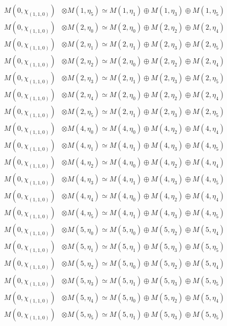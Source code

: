 \begin{align*}
M(0,\chi_{(1,1,0)}) &\otimes M(1,\eta_{5}) \simeq M(1,\eta_{1}) \oplus M(1,\eta_{3}) \oplus M(1,\eta_{5}) \\
M(0,\chi_{(1,1,0)}) &\otimes M(2,\eta_{0}) \simeq M(2,\eta_{0}) \oplus M(2,\eta_{2}) \oplus M(2,\eta_{4}) \\
M(0,\chi_{(1,1,0)}) &\otimes M(2,\eta_{1}) \simeq M(2,\eta_{1}) \oplus M(2,\eta_{3}) \oplus M(2,\eta_{5}) \\
M(0,\chi_{(1,1,0)}) &\otimes M(2,\eta_{2}) \simeq M(2,\eta_{0}) \oplus M(2,\eta_{2}) \oplus M(2,\eta_{4}) \\
M(0,\chi_{(1,1,0)}) &\otimes M(2,\eta_{3}) \simeq M(2,\eta_{1}) \oplus M(2,\eta_{3}) \oplus M(2,\eta_{5}) \\
M(0,\chi_{(1,1,0)}) &\otimes M(2,\eta_{4}) \simeq M(2,\eta_{0}) \oplus M(2,\eta_{2}) \oplus M(2,\eta_{4}) \\
M(0,\chi_{(1,1,0)}) &\otimes M(2,\eta_{5}) \simeq M(2,\eta_{1}) \oplus M(2,\eta_{3}) \oplus M(2,\eta_{5}) \\
M(0,\chi_{(1,1,0)}) &\otimes M(4,\eta_{0}) \simeq M(4,\eta_{0}) \oplus M(4,\eta_{2}) \oplus M(4,\eta_{4}) \\
M(0,\chi_{(1,1,0)}) &\otimes M(4,\eta_{1}) \simeq M(4,\eta_{1}) \oplus M(4,\eta_{3}) \oplus M(4,\eta_{5}) \\
M(0,\chi_{(1,1,0)}) &\otimes M(4,\eta_{2}) \simeq M(4,\eta_{0}) \oplus M(4,\eta_{2}) \oplus M(4,\eta_{4}) \\
M(0,\chi_{(1,1,0)}) &\otimes M(4,\eta_{3}) \simeq M(4,\eta_{1}) \oplus M(4,\eta_{3}) \oplus M(4,\eta_{5}) \\
M(0,\chi_{(1,1,0)}) &\otimes M(4,\eta_{4}) \simeq M(4,\eta_{0}) \oplus M(4,\eta_{2}) \oplus M(4,\eta_{4}) \\
M(0,\chi_{(1,1,0)}) &\otimes M(4,\eta_{5}) \simeq M(4,\eta_{1}) \oplus M(4,\eta_{3}) \oplus M(4,\eta_{5}) \\
M(0,\chi_{(1,1,0)}) &\otimes M(5,\eta_{0}) \simeq M(5,\eta_{0}) \oplus M(5,\eta_{2}) \oplus M(5,\eta_{4}) \\
M(0,\chi_{(1,1,0)}) &\otimes M(5,\eta_{1}) \simeq M(5,\eta_{1}) \oplus M(5,\eta_{3}) \oplus M(5,\eta_{5}) \\
M(0,\chi_{(1,1,0)}) &\otimes M(5,\eta_{2}) \simeq M(5,\eta_{0}) \oplus M(5,\eta_{2}) \oplus M(5,\eta_{4}) \\
M(0,\chi_{(1,1,0)}) &\otimes M(5,\eta_{3}) \simeq M(5,\eta_{1}) \oplus M(5,\eta_{3}) \oplus M(5,\eta_{5}) \\
M(0,\chi_{(1,1,0)}) &\otimes M(5,\eta_{4}) \simeq M(5,\eta_{0}) \oplus M(5,\eta_{2}) \oplus M(5,\eta_{4}) \\
M(0,\chi_{(1,1,0)}) &\otimes M(5,\eta_{5}) \simeq M(5,\eta_{1}) \oplus M(5,\eta_{3}) \oplus M(5,\eta_{5}) \\
\end{align*}

